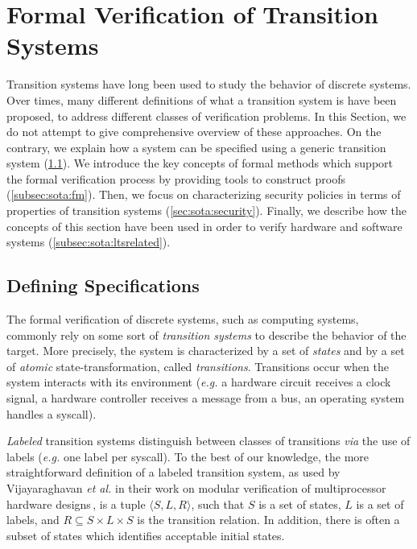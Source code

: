 \section{Formal Verification of Transition Systems}
\label{sec:sota:formalisms}

Transition systems have long been used to study the behavior of discrete
systems.
%
Over times, many different definitions of what a transition system is have been
proposed, to address different classes of verification problems.
%
In this Section, we do not attempt to give comprehensive overview of these
approaches.
%
On the contrary, we explain how a system can be specified using a generic
transition system (\ref{subsec:sota:ltsdef}).
%
We introduce the key concepts of formal methods which support the formal
verification process by providing tools to construct proofs
(\ref{subsec:sota:fm}).
%
Then, we focus on characterizing security policies in terms of properties of
transition systems (\ref{sec:sota:security}).
%
Finally, we describe how the concepts of this section have been used in order to
verify hardware and software systems (\ref{subsec:sota:ltsrelated}).

\subsection{Defining Specifications}
\label{subsec:sota:ltsdef}

The formal verification of discrete systems, such as computing systems, commonly
rely on some sort of \emph{transition systems} to describe the behavior of the
target.
%
More precisely, the system is characterized by a set of \emph{states} and by a
set of \emph{atomic} state-transformation, called \emph{transitions}.
%
Transitions occur when the system interacts with its environment (\emph{e.g.} a
hardware circuit receives a clock signal, a hardware controller receives a
message from a bus, an operating system handles a syscall).

\emph{Labeled} transition systems distinguish between classes of transitions
\emph{via} the use of labels (\emph{e.g.} one label per syscall).
%
To the best of our knowledge, the more straightforward definition of a labeled
transition system, as used by Vijayaraghavan \emph{et al.} in their work on
modular verification of multiprocessor hardware
designs\,\cite{vijayaraghavan2015modular}, is a tuple
\( \langle S, L, R \rangle \), such that \( S \) is a set of states, \( L \) is
a set of labels, and \( R \subseteq S \times L \times S \) is the transition
relation.
%
In addition, there is often a subset of states which identifies acceptable
initial states.

